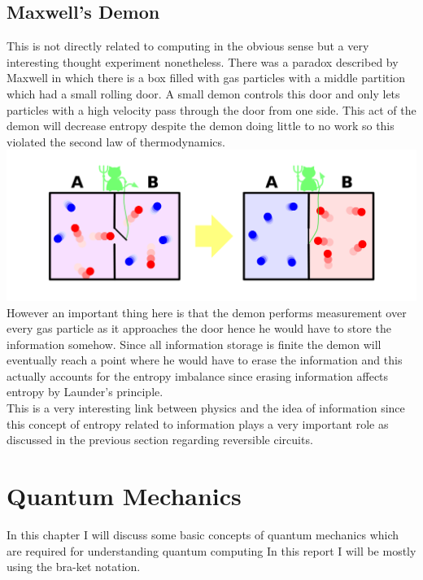 \documentclass{report}
\begin{document}
\section{Maxwell's Demon}
This is not directly related to computing in the obvious sense but a very interesting thought experiment nonetheless. There was a paradox described by Maxwell in which there is a box filled with gas particles with a middle partition which had a small rolling door. 
A small demon controls this door and only lets particles with a high velocity pass through the door from one side. This act of the demon will decrease entropy despite the demon doing little to no work so this violated the second law of thermodynamics.\\
\includegraphics[width = \textwidth]{images/Maxwells demon.png}\\
However an important thing here is that the demon performs measurement over every gas particle as it approaches the door hence he would have to store the information somehow. Since all information storage is finite the demon will eventually reach a point where he would have to erase the information and this actually accounts for the entropy imbalance since erasing information affects entropy by Launder's principle.\\
This is a very interesting link between physics and the idea of information since this concept of entropy related to information plays a very important role as discussed in the previous section regarding reversible circuits.




\chapter{Quantum Mechanics}
In this chapter I will discuss some basic concepts of quantum mechanics which are required for understanding quantum computing
In this report I will be mostly using the bra-ket notation.\\
\end{document}
